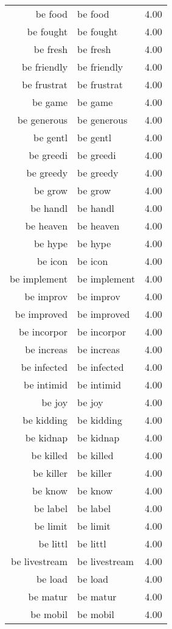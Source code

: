 \begin{table}[ht]
\begin{tabular}{rlr}
  be food & be food & 4.00 \\ 
  be fought & be fought & 4.00 \\ 
  be fresh & be fresh & 4.00 \\ 
  be friendly & be friendly & 4.00 \\ 
  be frustrat & be frustrat & 4.00 \\ 
  be game & be game & 4.00 \\ 
  be generous & be generous & 4.00 \\ 
  be gentl & be gentl & 4.00 \\ 
  be greedi & be greedi & 4.00 \\ 
  be greedy & be greedy & 4.00 \\ 
  be grow & be grow & 4.00 \\ 
  be handl & be handl & 4.00 \\ 
  be heaven & be heaven & 4.00 \\ 
  be hype & be hype & 4.00 \\ 
  be icon & be icon & 4.00 \\ 
  be implement & be implement & 4.00 \\ 
  be improv & be improv & 4.00 \\ 
  be improved & be improved & 4.00 \\ 
  be incorpor & be incorpor & 4.00 \\ 
  be increas & be increas & 4.00 \\ 
  be infected & be infected & 4.00 \\ 
  be intimid & be intimid & 4.00 \\ 
  be joy & be joy & 4.00 \\ 
  be kidding & be kidding & 4.00 \\ 
  be kidnap & be kidnap & 4.00 \\ 
  be killed & be killed & 4.00 \\ 
  be killer & be killer & 4.00 \\ 
  be know & be know & 4.00 \\ 
  be label & be label & 4.00 \\ 
  be limit & be limit & 4.00 \\ 
  be littl & be littl & 4.00 \\ 
  be livestream & be livestream & 4.00 \\ 
  be load & be load & 4.00 \\ 
  be matur & be matur & 4.00 \\ 
  be mobil & be mobil & 4.00 \\ 

\end{tabular}
\end{table}
